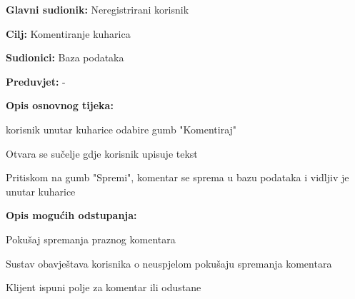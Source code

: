 					\noindent {}
					\begin{packed_item}
	
						\item \textbf{Glavni sudionik: }Neregistrirani korisnik
						\item  \textbf{Cilj:} Komentiranje kuharica
						\item  \textbf{Sudionici:} Baza podataka
						\item  \textbf{Preduvjet:} -
						\item  \textbf{Opis osnovnog tijeka:} 
						
						\item[] \begin{packed_enum}
	
							\item korisnik unutar kuharice odabire gumb "Komentiraj"
							\item Otvara se sučelje gdje korisnik upisuje tekst
							\item Pritiskom na gumb "Spremi", komentar se sprema u bazu podataka i vidljiv je unutar kuharice
						\end{packed_enum}
						
						\item  \textbf{Opis mogućih odstupanja:}
						
						\item[] \begin{packed_item}
	
							\item[2.a] Pokušaj spremanja praznog komentara
							\item[] \begin{packed_enum}
								
								\item Sustav obavještava korisnika o neuspjelom pokušaju spremanja komentara 
								\item Klijent ispuni polje za komentar ili odustane
								
							\end{packed_enum}

						\end{packed_item}
					\end{packed_item}



